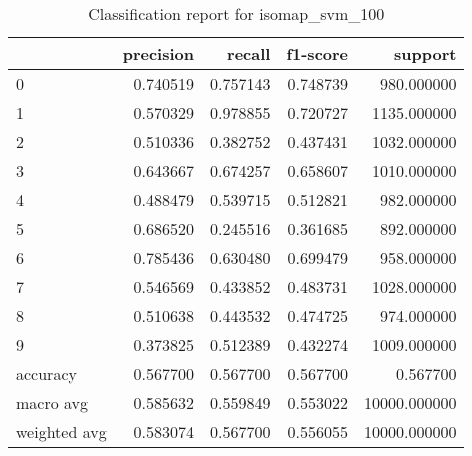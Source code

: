 \begin{table}[htb!]
\centering
\caption{Classification report for isomap_svm_100}
\label{tab:classification-report-isomap_svm_100}
\begin{tabular}{lrrrr}
\toprule
 & precision & recall & f1-score & support \\
\midrule
0 & 0.740519 & 0.757143 & 0.748739 & 980.000000 \\
1 & 0.570329 & 0.978855 & 0.720727 & 1135.000000 \\
2 & 0.510336 & 0.382752 & 0.437431 & 1032.000000 \\
3 & 0.643667 & 0.674257 & 0.658607 & 1010.000000 \\
4 & 0.488479 & 0.539715 & 0.512821 & 982.000000 \\
5 & 0.686520 & 0.245516 & 0.361685 & 892.000000 \\
6 & 0.785436 & 0.630480 & 0.699479 & 958.000000 \\
7 & 0.546569 & 0.433852 & 0.483731 & 1028.000000 \\
8 & 0.510638 & 0.443532 & 0.474725 & 974.000000 \\
9 & 0.373825 & 0.512389 & 0.432274 & 1009.000000 \\
accuracy & 0.567700 & 0.567700 & 0.567700 & 0.567700 \\
macro avg & 0.585632 & 0.559849 & 0.553022 & 10000.000000 \\
weighted avg & 0.583074 & 0.567700 & 0.556055 & 10000.000000 \\
\bottomrule
\end{tabular}
\end{table}
